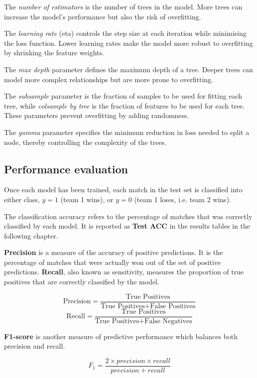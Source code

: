 The \textit{number of estimators} is the number of trees in the model. More trees can increase the model's performance but also the risk of overfitting.

The \textit{learning rate} (eta) controls the step size at each iteration while minimising the loss function. Lower learning rates make the model more robust to overfitting by shrinking the feature weights.

The \textit{max depth} parameter defines the maximum depth of a tree. Deeper trees can model more complex relationships but are more prone to overfitting.

The \textit{subsample} parameter is the fraction of samples to be used for fitting each tree, while \textit{colsample by tree} is the fraction of features to be used for each tree. These parameters prevent overfitting by adding randomness.

The \textit{gamma} parameter specifies the minimum reduction in loss needed to split a node, thereby controlling the complexity of the trees.
 
\subsection{Performance evaluation}

Once each model has been trained, each match in the test set is classified into either class, $y=1$ (team 1 wins), or $y=0$ (team 1 loses, i.e. team 2 wins). 

The classification accuracy refers to the percentage of matches that was correctly classified by each model. It is reported as \textbf{Test ACC} in the results tables in the following chapter. 

\textbf{Precision} is a measure of the accuracy of positive predictions. It is the percentage of matches that were actually won out of the set of positive predictions. \textbf{Recall}, also known as sensitivity, measures the proportion of true positives that are correctly classified by the model.

\[ \text{Precision} = \frac{\text{True Positives}}{\text{True Positives} + \text{False Positives}} \]
\[ \text{Recall} = \frac{\text{True Positives}}{\text{True Positives} + \text{False Negatives}} \]

\textbf{F1-score} is another measure of predictive performance which balances both precision and recall. 

\[ F_1 = \frac{2 \times precision \times recall}{precision + recall} \]

